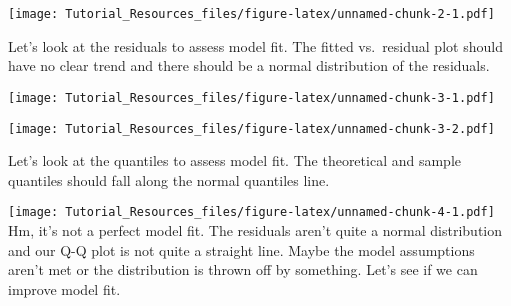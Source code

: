 \documentclass[
]{article}
\newenvironment{Shaded}{\begin{snugshade}}{\end{snugshade}}
\newcommand{\AttributeTok}[1]{\textcolor[rgb]{0.13,0.29,0.53}{#1}}
\newcommand{\FloatTok}[1]{\textcolor[rgb]{0.00,0.00,0.81}{#1}}
\newcommand{\FunctionTok}[1]{\textcolor[rgb]{0.13,0.29,0.53}{\textbf{#1}}}
\newcommand{\NormalTok}[1]{#1}
\newcommand{\OtherTok}[1]{\textcolor[rgb]{0.56,0.35,0.01}{#1}}
\newcommand{\SpecialCharTok}[1]{\textcolor[rgb]{0.81,0.36,0.00}{\textbf{#1}}}
\newcommand{\StringTok}[1]{\textcolor[rgb]{0.31,0.60,0.02}{#1}}
\begin{document}
\texttt{[image: Tutorial\_Resources\_files/figure-latex/unnamed-chunk-2-1.pdf]}

Let's look at the residuals to assess model fit. The fitted vs.~residual
plot should have no clear trend and there should be a normal
distribution of the residuals.

\begin{Shaded}
\end{Shaded}

\texttt{[image: Tutorial\_Resources\_files/figure-latex/unnamed-chunk-3-1.pdf]}

\begin{Shaded}
\end{Shaded}

\texttt{[image: Tutorial\_Resources\_files/figure-latex/unnamed-chunk-3-2.pdf]}

Let's look at the quantiles to assess model fit. The theoretical and
sample quantiles should fall along the normal quantiles line.

\begin{Shaded}
\end{Shaded}

\texttt{[image: Tutorial\_Resources\_files/figure-latex/unnamed-chunk-4-1.pdf]}
Hm, it's not a perfect model fit. The residuals aren't quite a normal
distribution and our Q-Q plot is not quite a straight line. Maybe the
model assumptions aren't met or the distribution is thrown off by
something. Let's see if we can improve model fit.
\end{document}
